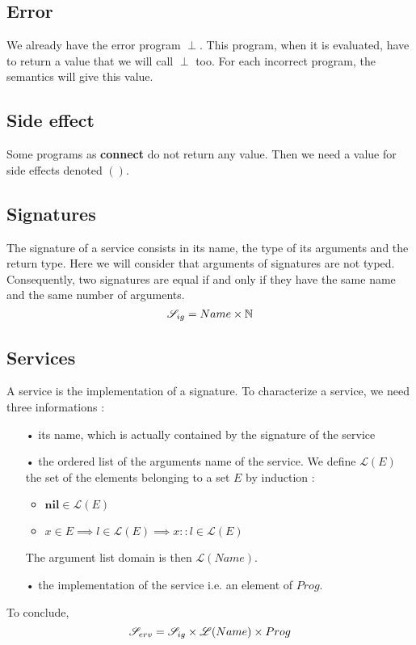 \subsection{Error}
We already have the error program $\perp$. This program, when it is evaluated, have to return a value that we will call $\perp$ too. For each incorrect program, the semantics will give this value.

\subsection{Side effect}
Some programs as \textbf{connect} do not return any value. Then we need a value for side effects denoted $()$.

\subsection{Signatures}
The signature of a service consists in its name, the type of its arguments and the return type.
Here we will consider that arguments of signatures are not typed. Consequently, two signatures are equal if and only if they have the same name and the same number of arguments. 
\[\mathcal{S}_{ig} = Name \times \mathbb{N}\]

\subsection{Services}
A service is the implementation of a signature. To characterize a service, we need three informations : 
\begin{itemize}
\item[•] its \textsf{name}, which is actually contained by the signature of the service
\item[•] the ordered list of the arguments name of the service. We define $\mathcal{L}(E)$
the set of the elements belonging to a set $E$ by induction : 
\begin{itemize}
\item $ \mathbf{nil} \in \mathcal{L}(E)$
\item $ x \in E  \implies l \in \mathcal{L}(E) \implies x::l \in \mathcal{L}(E) $
\end{itemize}
The argument list domain is then $\mathcal{L}(Name)$.
\item[•] the \textsf{implementation} of the service i.e. an element of $Prog$.
\end{itemize}
To conclude, 
\[\mathcal{S}_{erv} = \mathcal{S}_{ig} \times \mathcal{L}(Name)\times Prog\]

